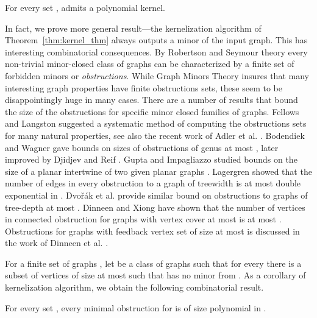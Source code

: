  \begin{theorem}\label{thm:kernel_thm}
 For every set  ,  
\fd{} admits a polynomial kernel.
\end{theorem}

In fact, we prove  more general result---the kernelization algorithm of Theorem~\ref{thm:kernel_thm} always outputs a minor of the input graph. 
This has interesting combinatorial consequences. By Robertson and Seymour theory every non-trivial minor-closed class of graphs can be characterized by a finite set of  forbidden minors or \emph{obstructions}. 
While Graph Minors Theory insures that many interesting graph properties have finite obstructions sets, these seem to be disappointingly huge in many cases. 
There are a number of results that bound the size of the obstructions for specific minor closed families of graphs. Fellows and Langston \cite{FellowsL89_focs,FellowsL94}
suggested  a systematic method of computing the obstructions sets for many natural properties,  see also the recent work of Adler et al.  
\cite{AdlerGK08}.
 Bodendiek and Wagner  gave bounds on sizes of obstructions of genus at most 
\cite{BodendiekW89}, later improved by   Djidjev and   Reif
\cite{DjidjevR91}.  Gupta and Impagliazzo studied bounds     
on the size of a planar intertwine of two given planar graphs
 \cite{GuptaI91}. Lagergren \cite{Lagergren98} showed that the number of edges in every obstruction to a graph  of treewidth  is at most double exponential in   .  
Dvo{\v{r}}{\'a}k et al.  \cite{Dvorak11} provide similar bound on obstructions to graphs of tree-depth at most . Dinneen and  Xiong have shown that the number of vertices in connected  obstruction  for graphs with vertex cover at most    is at most   \cite{Dinneen02VC}. Obstructions for graphs with feedback vertex set of size at most  is discussed in the work of Dinneen et al. 
 \cite{DinneenCF01}.
 

For a finite set of graphs  , let  be a class of graphs such that for every  there is a subset of vertices  of size at most  such that  has no minor from .  As a corollary of kernelization algorithm, we obtain the following combinatorial result.  
\begin{theorem}\label{thm:kernel_thm}
 For every set  ,  
every minimal obstruction for    is of size  polynomial in . 
\end{theorem}



\vspace{-.5cm}
